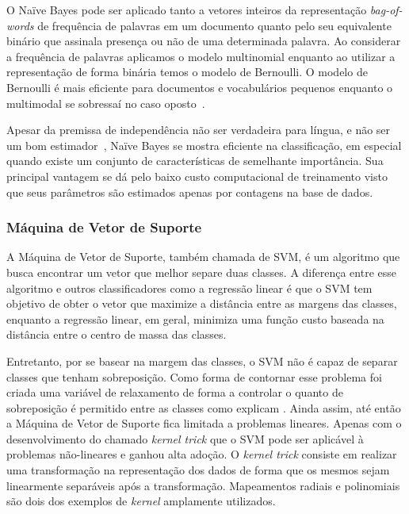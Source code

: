 O Naïve Bayes pode ser aplicado tanto a vetores inteiros da representação
\textit{bag-of-words} de frequência de palavras em um documento quanto pelo seu
equivalente binário que assinala presença ou não de uma determinada palavra.
Ao considerar a frequência de palavras aplicamos o modelo multinomial enquanto
ao utilizar a representação de forma binária temos o modelo de Bernoulli.
O modelo de Bernoulli é mais eficiente para documentos e vocabulários pequenos
enquanto o multimodal se sobressaí no caso oposto~\cite{schutze08}.

Apesar da premissa de independência não ser verdadeira para língua, e não ser um
bom estimador~\cite{schutze08}, Naïve Bayes se mostra eficiente na
classificação, em especial quando existe um conjunto de características de
semelhante importância.
Sua principal vantagem se dá pelo baixo custo computacional de treinamento visto
que seus parâmetros são estimados apenas por contagens na base de dados.

\subsubsection{Máquina de Vetor de Suporte}

A Máquina de Vetor de Suporte, também chamada de SVM, é um algoritmo que busca
encontrar um vetor que melhor separe duas classes.
A diferença entre esse algoritmo e outros classificadores como a regressão
linear é que o SVM tem objetivo de obter o vetor que maximize a distância entre
as margens das classes, enquanto a regressão linear, em geral, minimiza uma
função custo baseada na distância entre o centro de massa das classes.

Entretanto, por se basear na margem das classes, o SVM não é capaz de separar
classes que tenham sobreposição.
Como forma de contornar esse problema foi criada uma variável de relaxamento de
forma a controlar o quanto de sobreposição é permitido entre as classes como
explicam \citet{cortes95}.
Ainda assim, até então a Máquina de Vetor de Suporte fica limitada a problemas
lineares.
Apenas com o desenvolvimento do chamado \textit{kernel trick} que o SVM pode ser
aplicável à problemas não-lineares e ganhou alta adoção.
O \textit{kernel trick} consiste em realizar uma transformação na representação
dos dados de forma que os mesmos sejam linearmente separáveis após a
transformação.
Mapeamentos radiais e polinomiais são dois dos exemplos de \textit{kernel}
amplamente utilizados.

